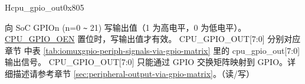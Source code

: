 \begin{register}{H}{cpu\_gpio\_out}{0x805}\label{regdesc:GPIO_OUT}
%
%
%
%
%
%
%
%
%
\regnewline%
\begin{regdesc}\begin{reglist}
\label{fielddesc:GPIO_OUT}\item [CPU\_GPIO\_OUT] 向 SoC GPIOn (n=0 \verb+~+ 21) 写输出值（1 为高电平，0 为低电平）。\hyperref[fielddesc:GPIO_OEN]{CPU\_GPIO\_OEN} 置位时，写输出值才有效。
\newline CPU\_GPIO\_OUT[7:0] 分别对应章节 \textit{} 中表 \ref{tab:iomuxgpio-periph-signals-via-gpio-matrix} 里的 cpu\_gpio\_out[7:0] 输出信号。
\newline CPU\_GPIO\_OUT[7:0] 只能通过 GPIO 交换矩阵映射到 GPIO。详细描述请参考章节 \ref{sec:peripheral-output-via-gpio-matrix}。（读/写）
\end{reglist}\end{regdesc}
\end{register}

